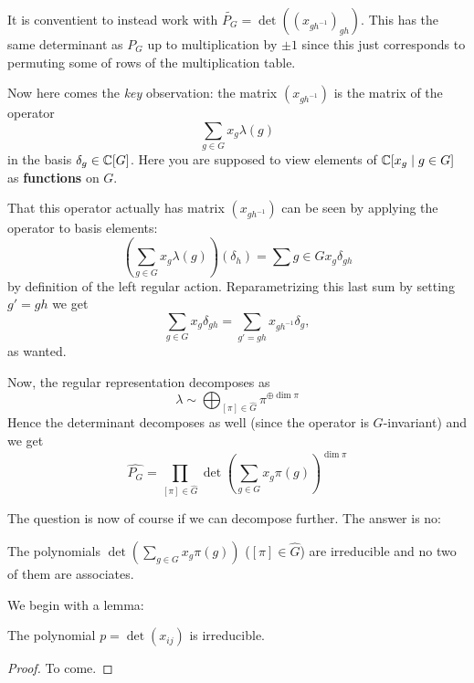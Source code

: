 \documentclass[11pt, english]{article}
\begin{document}
It is conventient to instead work with $\widetilde{P_G}=\det( {(x_{gh^{-1}})}_{gh})$. This has the same determinant as $P_G$ up to multiplication by $\pm 1$ since this just corresponds to permuting some of rows of the multiplication table.

Now here comes the \emph{key} observation: the matrix $(x_{gh^{-1}})$ is the matrix of the operator 
$$
\sum_{g \in G} x_g \lambda(g)
$$
in the basis $\delta_g \in \mathbb{C}[G]$. Here you are supposed to view elements of $\mathbb{C}[x_g \mid g \in G]$ as \textbf{functions} on $G$.

That this operator actually has matrix $(x_{gh^{-1}})$ can be seen by applying the operator to basis elements:
$$
\left(\sum_{g \in G} x_g \lambda(g)\right)(\delta_h) = \sum{g \in G} x_g \delta_{gh}
$$
by definition of the left regular action. Reparametrizing this last sum by setting $g' = gh$ we get
$$
\sum_{g \in G} x_g \delta_{gh} = \sum_{g' = gh} x_{gh^{-1}} \delta_g,
$$
as wanted.

Now, the regular representation decomposes as
$$
\lambda \sim \bigoplus_{[\pi] \in \widehat G}  \pi^{\oplus \dim \pi}
$$
Hence the determinant decomposes as well (since the operator is $G$-invariant) and we get
$$
\widehat{P_G} = \prod_{[\pi] \in \widehat G} \det\left( \sum_{g \in G} x_g \pi(g) \right)^{\dim \pi}
$$

The question is now of course if we can decompose further. The answer is no:

\begin{thm}[Frobenius]
The polynomials $\det\left(\sum_{g \in G} x_g \pi(g) \right)$ ($[\pi] \in \widehat G$) are irreducible and no two of them are associates.
\end{thm}

We begin with a lemma:
\begin{lemma}
 The polynomial $p=\det (x_{ij})$ is irreducible.
\end{lemma}

\begin{proof}
  To come.
\end{proof}
\end{document}
